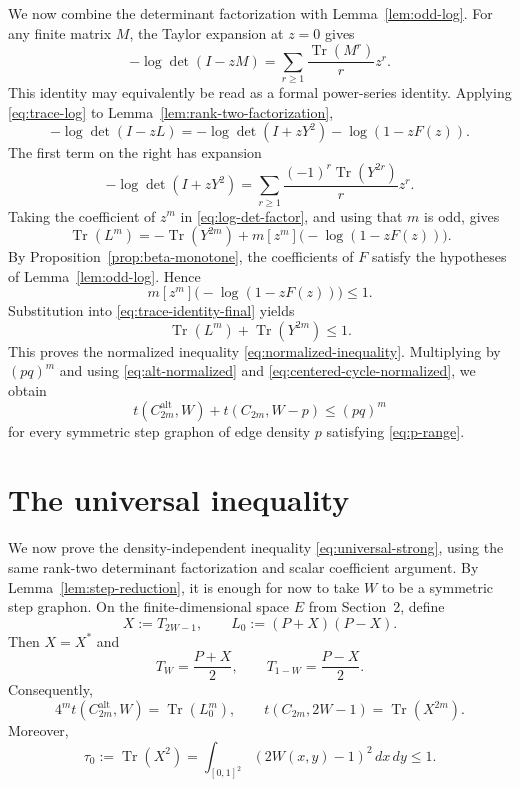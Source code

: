 \documentclass[11pt]{article}
\newcommand{\Tr}{\operatorname{Tr}}
\newcommand{\Alt}{\mathrm{alt}}
\begin{document}
We now combine the determinant factorization with Lemma~\ref{lem:odd-log}.  For any finite matrix $M$, the Taylor expansion at $z=0$ gives
\begin{equation}
   -\log\det(I-zM)
   =\sum_{r\ge1}\frac{\Tr(M^r)}{r}z^r.
   \label{eq:trace-log}
\end{equation}
This identity may equivalently be read as a formal power-series identity.  Applying \eqref{eq:trace-log} to Lemma~\ref{lem:rank-two-factorization},
\begin{equation}
   -\log\det(I-zL)
   =-\log\det(I+zY^2)-\log(1-zF(z)).
   \label{eq:log-det-factor}
\end{equation}
The first term on the right has expansion
\begin{equation}
   -\log\det(I+zY^2)
   =\sum_{r\ge1}\frac{(-1)^r\Tr(Y^{2r})}{r}z^r.
   \label{eq:Y-log}
\end{equation}
Taking the coefficient of $z^m$ in \eqref{eq:log-det-factor}, and using that $m$ is odd, gives
\begin{equation}
   \Tr(L^m)
   =-\Tr(Y^{2m})
    +m[z^m]\bigl(-\log(1-zF(z))\bigr).
   \label{eq:trace-identity-final}
\end{equation}
By Proposition~\ref{prop:beta-monotone}, the coefficients of $F$ satisfy the hypotheses of Lemma~\ref{lem:odd-log}.  Hence
\[
   m[z^m]\bigl(-\log(1-zF(z))\bigr)\le1.
\]
Substitution into \eqref{eq:trace-identity-final} yields
\begin{equation}
   \Tr(L^m)+\Tr(Y^{2m})\le1.
   \label{eq:abstract-proved}
\end{equation}
This proves the normalized inequality \eqref{eq:normalized-inequality}.  Multiplying by $(pq)^m$ and using \eqref{eq:alt-normalized} and \eqref{eq:centered-cycle-normalized}, we obtain
\[
   t(C_{2m}^{\Alt},W)+t(C_{2m},W-p)\le(pq)^m
\]
for every symmetric step graphon of edge density $p$ satisfying \eqref{eq:p-range}.

\section{The universal inequality}\label{sec:universal-proof}

We now prove the density-independent inequality \eqref{eq:universal-strong}, using the same
rank-two determinant factorization and scalar coefficient argument.  By Lemma~\ref{lem:step-reduction}, it is enough for
now to take $W$ to be a symmetric step graphon.  On the finite-dimensional space $E$ from
Section~2, define
\[
   X:=T_{2W-1},
   \qquad
   L_0:=(P+X)(P-X).
\]
Then $X=X^*$ and
\begin{equation}
   T_W=\frac{P+X}{2},
   \qquad
   T_{1-W}=\frac{P-X}{2}.
   \label{eq:universal-coordinates}
\end{equation}
Consequently,
\begin{equation}
   4^m t(C_{2m}^{\Alt},W)=\Tr(L_0^m),
   \qquad
   t(C_{2m},2W-1)=\Tr(X^{2m}).
   \label{eq:universal-traces}
\end{equation}
Moreover,
\begin{equation}
   \tau_0:=\Tr(X^2)
   =\int_{[0,1]^2}(2W(x,y)-1)^2\,dx\,dy
   \le1.
   \label{eq:universal-hs-bound}
\end{equation}
\end{document}
